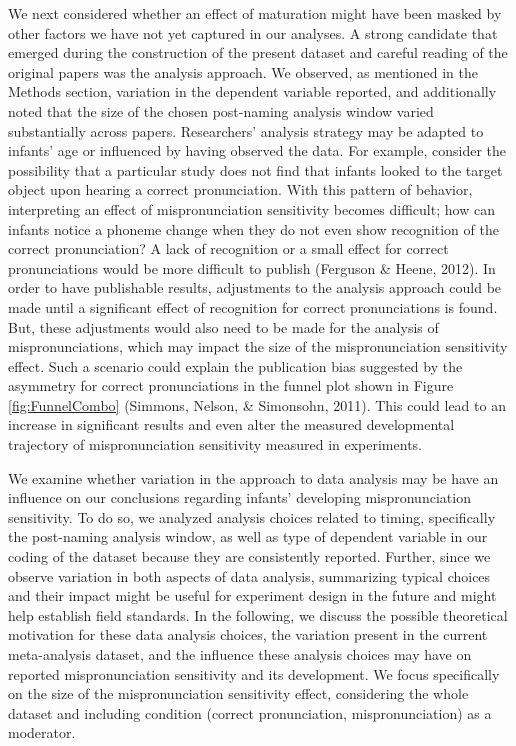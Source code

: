 \documentclass[
  english,
  man, noextraspace]{apa6}
\begin{document}
We next considered whether an effect of maturation might have been masked by other factors we have not yet captured in our analyses. A strong candidate that emerged during the construction of the present dataset and careful reading of the original papers was the analysis approach. We observed, as mentioned in the Methods section, variation in the dependent variable reported, and additionally noted that the size of the chosen post-naming analysis window varied substantially across papers. Researchers' analysis strategy may be adapted to infants' age or influenced by having observed the data. For example, consider the possibility that a particular study does not find that infants looked to the target object upon hearing a correct pronunciation. With this pattern of behavior, interpreting an effect of mispronunciation sensitivity becomes difficult; how can infants notice a phoneme change when they do not even show recognition of the correct pronunciation? A lack of recognition or a small effect for correct pronunciations would be more difficult to publish (Ferguson \& Heene, 2012). In order to have publishable results, adjustments to the analysis approach could be made until a significant effect of recognition for correct pronunciations is found. But, these adjustments would also need to be made for the analysis of mispronunciations, which may impact the size of the mispronunciation sensitivity effect. Such a scenario could explain the publication bias suggested by the asymmetry for correct pronunciations in the funnel plot shown in Figure \ref{fig:FunnelCombo} (Simmons, Nelson, \& Simonsohn, 2011). This could lead to an increase in significant results and even alter the measured developmental trajectory of mispronunciation sensitivity measured in experiments.

We examine whether variation in the approach to data analysis may be have an influence on our conclusions regarding infants' developing mispronunciation sensitivity. To do so, we analyzed analysis choices related to timing, specifically the post-naming analysis window, as well as type of dependent variable in our coding of the dataset because they are consistently reported. Further, since we observe variation in both aspects of data analysis, summarizing typical choices and their impact might be useful for experiment design in the future and might help establish field standards. In the following, we discuss the possible theoretical motivation for these data analysis choices, the variation present in the current meta-analysis dataset, and the influence these analysis choices may have on reported mispronunciation sensitivity and its development. We focus specifically on the size of the mispronunciation sensitivity effect, considering the whole dataset and including condition (correct pronunciation, mispronunciation) as a moderator.
\end{document}
